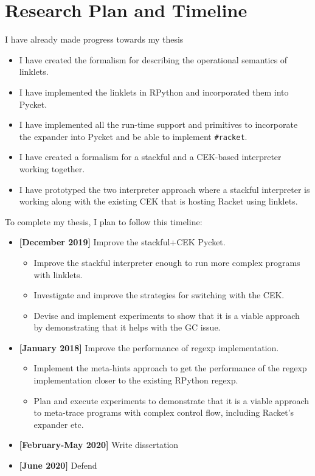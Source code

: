 \vspace{-0.25cm}

\section{Research Plan and Timeline}
\label{sec:timeline}
\vspace{-0.20cm}
I have already made progress towards my thesis
\vspace{-0.05cm}
\begin{itemize}
  \setlength\itemsep{0.01cm}
\item I have created the formalism for describing the operational
  semantics of linklets.
\item I have implemented the linklets in RPython and incorporated them into
  Pycket.
\item I have implemented all the run-time support and primitives to
  incorporate the expander into Pycket and be able to implement
  \texttt{\#racket}.
\item I have created a formalism for a stackful and a CEK-based
  interpreter working together.
\item I have prototyped the two interpreter approach where a stackful
  interpreter is working along with the existing CEK that is hosting
  Racket using linklets.
\end{itemize}

To complete my thesis, I plan to follow this timeline:
\vspace{-0.10cm}
\begin{itemize}
  \setlength\itemsep{0.01cm}
  \item \textbf{[December 2019]} Improve the stackful+CEK Pycket.
    \begin{itemize}
      \setlength\itemsep{0.01cm}
    \item Improve the stackful interpreter enough to run more complex
      programs with linklets.
     \item Investigate and improve the strategies for switching with
       the CEK.
     \item Devise and implement experiments to show that it is a
       viable approach by demonstrating that it helps with the GC
       issue.
    \end{itemize}
  \item \textbf{[January 2018]} Improve the performance of regexp
    implementation.
    \begin{itemize}
      \setlength\itemsep{0.01cm}
      \item Implement the meta-hints approach to get the performance
        of the regexp implementation closer to the existing RPython
        regexp.
      \item Plan and execute experiments to demonstrate that it is a
        viable approach to meta-trace programs with complex control
        flow, including Racket's expander etc.
    \end{itemize}
  \item \textbf{[February-May 2020]} Write dissertation
  \item \textbf{[June 2020]} Defend
\end{itemize}

